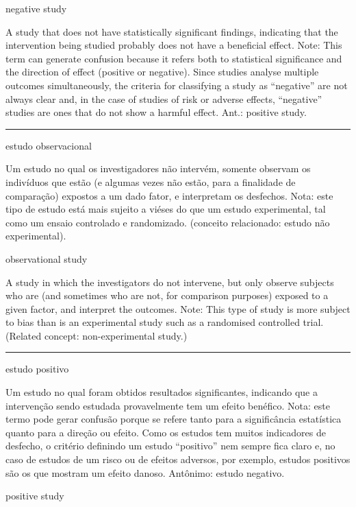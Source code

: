 \documentclass[
]{book}
\begin{document}
negative study

A study that does not have statistically significant findings, indicating that the intervention being studied probably does not have a beneficial effect. Note: This term can generate confusion because it refers both to statistical significance and the direction of effect (positive or negative). Since studies analyse multiple outcomes simultaneously, the criteria for classifying a study as ``negative'' are not always clear and, in the case of studies of risk or adverse effects, ``negative'' studies are ones that do not show a harmful effect. Ant.: positive study.

\begin{center}\rule{0.5\linewidth}{0.5pt}\end{center}

estudo observacional

Um estudo no qual os investigadores não intervém, somente observam os indivíduos que estão (e algumas vezes não estão, para a finalidade de comparação) expostos a um dado fator, e interpretam os desfechos. Nota: este tipo de estudo está mais sujeito a viéses do que um estudo experimental, tal como um ensaio controlado e randomizado. (conceito relacionado: estudo não experimental).

observational study

A study in which the investigators do not intervene, but only observe subjects who are (and sometimes who are not, for comparison purposes) exposed to a given factor, and interpret the outcomes. Note: This type of study is more subject to bias than is an experimental study such as a randomised controlled trial. (Related concept: non-experimental study.)

\begin{center}\rule{0.5\linewidth}{0.5pt}\end{center}

estudo positivo

Um estudo no qual foram obtidos resultados significantes, indicando que a intervenção sendo estudada provavelmente tem um efeito benéfico. Nota: este termo pode gerar confusão porque se refere tanto para a significância estatística quanto para a direção ou efeito. Como os estudos tem muitos indicadores de desfecho, o critério definindo um estudo ``positivo'' nem sempre fica claro e, no caso de estudos de um risco ou de efeitos adversos, por exemplo, estudos positivos são os que mostram um efeito danoso. Antônimo: estudo negativo.

positive study
\end{document}
